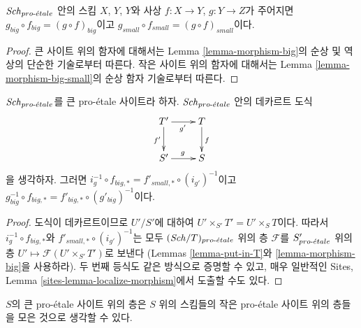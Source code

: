 \begin{lemma}
\label{lemma-composition-proetale}
$\mathit{Sch}_{pro\text{-}\acute{e}tale}$ 안의 스킴 $X$, $Y$, $Y$와 사상
$f : X \to Y$, $g : Y \to Z$가 주어지면
$g_{big} \circ f_{big} = (g \circ f)_{big}$이고
$g_{small} \circ f_{small} = (g \circ f)_{small}$이다.
\end{lemma}

\begin{proof}
큰 사이트 위의 함자에 대해서는 Lemma \ref{lemma-morphism-big}의
순상 및 역상의 단순한 기술로부터 따른다. 작은 사이트 위의 함자에
대해서는 Lemma \ref{lemma-morphism-big-small}의 순상 함자 기술로부터
따른다.
\end{proof}

\begin{lemma}
\label{lemma-morphism-big-small-cartesian-diagram}
$\mathit{Sch}_{pro\text{-}\acute{e}tale}$를 큰 pro-\'etale 사이트라 하자.
$\mathit{Sch}_{pro\text{-}\acute{e}tale}$ 안의 데카르트 도식
$$
\xymatrix{
T' \ar[r]_{g'} \ar[d]_{f'} & T \ar[d]^f \\
S' \ar[r]^g & S
}
$$
을 생각하자. 그러면
$i_g^{-1} \circ f_{big, *} = f'_{small, *} \circ (i_{g'})^{-1}$이고
$g_{big}^{-1} \circ f_{big, *} = f'_{big, *} \circ (g'_{big})^{-1}$이다.
\end{lemma}

\begin{proof}
도식이 데카르트이므로 $U'/S'$에 대하여
$U' \times_{S'} T' = U' \times_S T$이다. 따라서
$i_g^{-1} \circ f_{big, *}$와
$f'_{small, *} \circ (i_{g'})^{-1}$는 모두
$(\mathit{Sch}/T)_{pro\text{-}\acute{e}tale}$ 위의 층 $\mathcal{F}$를
$S'_{pro\text{-}\acute{e}tale}$ 위의 층
$U' \mapsto \mathcal{F}(U' \times_{S'} T')$로 보낸다
(Lemmas \ref{lemma-put-in-T}와 \ref{lemma-morphism-big}을 사용하라).
두 번째 등식도 같은 방식으로 증명할 수 있고, 매우 일반적인
Sites, Lemma \ref{sites-lemma-localize-morphism}에서 도출할 수도 있다.
\end{proof}

\noindent
$S$의 큰 pro-\'etale 사이트 위의 층은 $S$ 위의 스킴들의 작은
pro-\'etale 사이트 위의 층들을 모은 것으로 생각할 수 있다.

